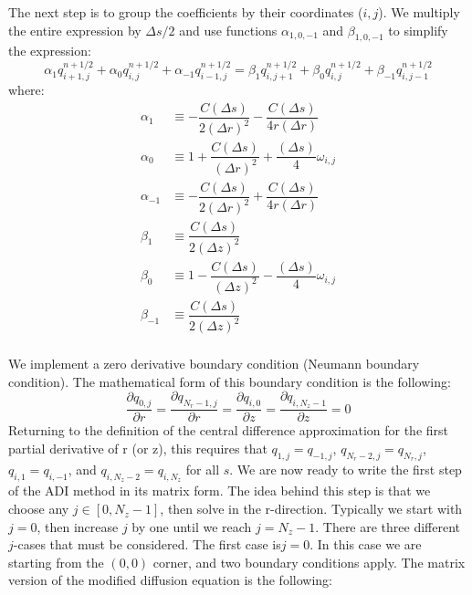 \documentclass[11pt]{article} %
\begin{document}
\noindent
The next step is to group the coefficients by their coordinates ($i,j$). We multiply the entire expression by $\Delta s/2$ and use functions $\alpha_{1,0,-1}$ and $\beta_{1,0,-1}$ to simplify the expression:
\begin{equation}
\alpha_1 q_{i+1,j}^{n+1/2} + \alpha_0 q_{i,j}^{n+1/2} + \alpha_{-1} q_{i-1,j}^{n+1/2} = \beta_1 q_{i,j+1}^{n+1/2} + \beta_0 q_{i,j}^{n+1/2} + \beta_{-1} q_{i,j-1}^{n+1/2}
\end{equation}
\noindent
where:
\begin{align}
\alpha_1 &\equiv - \dfrac{C (\Delta s)}{2(\Delta r)^2} - \dfrac{C (\Delta s)}{4r(\Delta r)} \\
\alpha_0 &\equiv 1 + \dfrac{C (\Delta s)}{(\Delta r)^2} + \dfrac{(\Delta s)}{4} \omega_{i,j} \\
\alpha_{-1}  &\equiv - \dfrac{C (\Delta s)}{2(\Delta r)^2} + \dfrac{C (\Delta s)}{4r(\Delta r)} \\
\beta_1  &\equiv \dfrac{C (\Delta s)}{2(\Delta z)^2} \\
\beta_0  &\equiv 1 - \dfrac{C (\Delta s)}{(\Delta z)^2} - \dfrac{(\Delta s)}{4} \omega_{i,j} \\
\beta_{-1}  &\equiv \dfrac{C (\Delta s)}{2(\Delta z)^2} 
\end{align} \\[12pt]

We implement a zero derivative boundary condition (Neumann boundary condition). The mathematical form of this boundary condition is the following:
\noindent
\begin{equation}
\dfrac{\partial q_{0,j}}{\partial r} = \dfrac{\partial q_{N_r-1,j}}{\partial r} = \dfrac{\partial q_{i,0}}{\partial z} = \dfrac{\partial q_{i,N_z-1}}{\partial z} = 0
\end{equation}
\noindent
Returning to the definition of the central difference approximation for the first partial derivative of r (or z), this requires that $q_{1,j} = q_{-1,j}$, $q_{N_r-2,j} = q_{N_r,j}$, $q_{i,1} = q_{i,-1}$, and $q_{i,N_z-2} = q_{i,N_z}$ for all $s$. We are now ready to write the first step of the ADI method in its matrix form. The idea behind this step is that we choose any $j \in [0,N_z-1]$, then solve in the r-direction. Typically we start with $j=0$, then increase $j$ by one until we reach $j=N_z-1$. There are three different $j$-cases that must be considered. The first case is$j=0$. In this case we are starting from the $(0,0)$ corner, and two boundary conditions apply. The matrix version of the modified diffusion equation is the following:
\end{document}
